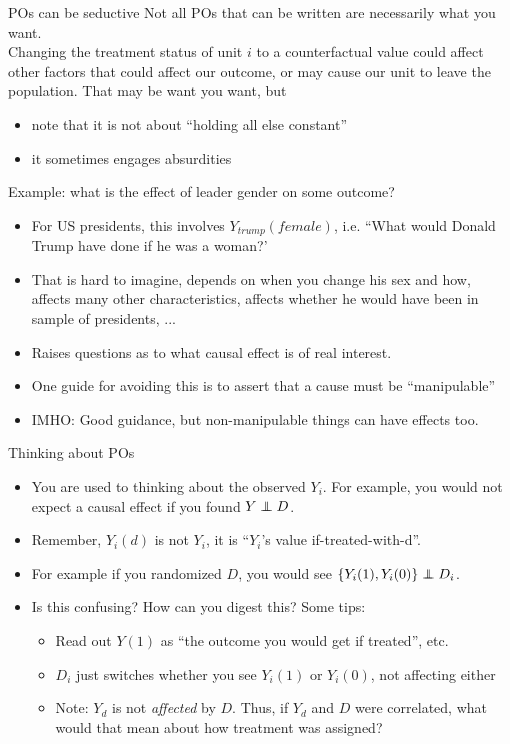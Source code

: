 \documentclass[xcolor=dvipsnames]{beamer}
\newcommand\indep{\protect\mathpalette{\protect\independenT}{\perp}}
\def\independenT#1#2{\mathrel{\rlap{$#1#2$}\mkern2mu{#1#2}}}
\begin{document}
\begin{frame}{POs can be seductive}
\small
{} Not all POs that can be written are necessarily what you want. \\
\bigskip
{} Changing the treatment status of unit $i$ to a counterfactual value could affect other factors that could affect our outcome, or may cause our unit to leave the population. That may be want you want, but 
\footnotesize
\begin{itemize}
\item note that it is not about ``holding all else constant''
\item it sometimes engages absurdities
\end{itemize}
\small
{} Example: what is the effect of leader gender on some outcome? \\
\footnotesize
\begin{itemize}
\item<4-> For US presidents, this involves $Y_{trump}(female)$, i.e. ``What would Donald Trump have done if he was a woman?'
\item<5-> That is hard to imagine, depends on when you change his sex and how, affects many other characteristics, affects whether he would have been in sample of presidents, ...
\item<6-> Raises questions as to what causal effect is of real interest.
\item<7-> One guide for avoiding this is to assert that a cause must be ``manipulable''
\item<8-> IMHO: Good guidance, but non-manipulable things can have effects too.
\end{itemize}
\end{frame}


\begin{frame}{Thinking about POs}
\small
\begin{itemize}
\item<1-> You are used to thinking about the observed $Y_i$. For example, you would not expect a causal effect if you found $Y \indep D$.
\item<2-> Remember, $Y_i(d)$ is not $Y_i$, it is ``$Y_i$'s value if-treated-with-d''. 
\item<3-> For example if you randomized $D$, you would see $\{Y_i(1),Y_i(0)\} \indep D_i$.
\item<4-> Is this confusing? How can you digest this? Some tips:
\begin{itemize}
\item<5-> Read out $Y(1)$ as ``the outcome you would get if treated'', etc.
\smallskip
\item<6-> $D_i$ just switches whether you see $Y_i(1)$ or $Y_i(0)$, not affecting either
\smallskip
\item<7-> Note: $Y_d$ is not \textit{affected} by $D$. Thus, if $Y_d$ and $D$ were correlated, what would that mean about how treatment was assigned?
\end{itemize}
\end{itemize}
\end{frame}
\end{document}
